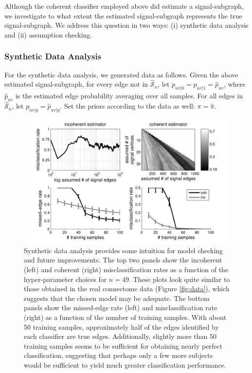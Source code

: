 \documentclass[10pt,journal,cspaper,compsoc]{IEEEtran}
\providecommand{\wh}[1]{\widehat{#1}}
\providecommand{\mhc}[1]{\widehat{\mathcal{#1}}}
\begin{document}
Although the coherent classifier employed above did estimate a signal-subgraph, we investigate to what extent the estimated signal-subgraph represents the true signal-subgraph.  We address this question in two ways:  (i) synthetic data analysis and (ii) assumption checking.  

\subsubsection{Synthetic Data Analysis} %
\label{ssub:synthetic_data_analysis}

For the synthetic data analysis, we generated data as follows.  Given the above estimated signal-subgraph, for every edge not in $\mhc{S}_n$, let $p_{uv|0}=p_{uv|1}=\wh{p}_{uv}$, where $\wh{p}_{uv}$ is the estimated edge probability averaging over all samples.  For all edges in $\mhc{S}_n$, let $p_{uv|y}=\wh{p}_{uv|y}$.  Set the priors according to the data as well: $\pi=\wh{\pi}$.  

\begin{figure}[tb!]
	\centering
		\includegraphics[width=0.7\linewidth]{../figs/BLSA0317_Count_synthetic_Lhats.pdf}
	\caption{Synthetic data analysis provides some intuition for model checking and future improvements.  The top two panels show the incoherent (left) and coherent (right) misclassification rates as a function of the hyper-parameter choices for $n=49$.  These plots look quite similar to those obtained in the real connectome data (Figure \ref{fig:data}), which suggests that the chosen model may be adequate.  The bottom panels show the missed-edge rate (left) and misclassification rate (right) as a function of the number of training samples.  With about 50 training samples, approximately half of the edges identified by each classifier are true edges.  Additionally, slightly more than 50 training samples seems to be sufficient for obtaining nearly perfect classification, suggesting that perhaps only a few more subjects would be sufficient to yield much greater classification performance.}
	\label{fig:synthetic}
\end{figure}
\end{document}
